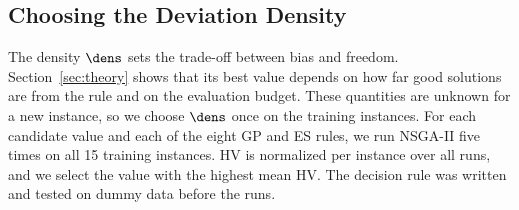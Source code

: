 \subsection{Choosing the Deviation Density}
\label{sec:method:k}

The density $\dens$ sets the trade-off between bias and freedom.
Section~\ref{sec:theory} shows that its best value depends on how far good solutions are from the rule and on the evaluation budget.
These quantities are unknown for a new instance, so we choose $\dens$ once on the training instances.
For each candidate value and each of the eight GP and ES rules, we run NSGA-II five times on all 15 training instances.
HV is normalized per instance over all runs, and we select the value with the highest mean HV.
The decision rule was written and tested on dummy data before the runs.
